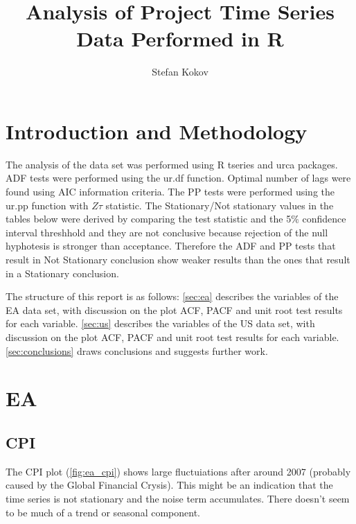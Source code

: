 \documentclass[10pt]{article}
\title{Analysis of Project Time Series Data Performed in R}
\author{Stefan Kokov}
\begin{document}
\maketitle



\section{Introduction and Methodology}
The analysis of the data set was performed using R tseries and urca packages.
ADF tests were performed using the ur.df function. Optimal number of lags were found using AIC information criteria. The PP tests were performed using the ur.pp function with $Z\tau$ statistic. The Stationary/Not stationary values in the tables below were derived by comparing the test statistic and the 5$\%$ confidence interval threshhold and they are not conclusive because rejection of the null hyphotesis is stronger than acceptance. Therefore the ADF and PP tests that result in Not Stationary conclusion show weaker results than the ones that result in a Stationary conclusion.

The structure of this report is as follows: \autoref{sec:ea} describes the variables of the EA data set, with discussion on the plot ACF, PACF and unit root test results for each variable. \autoref{sec:us} describes the variables of the US data set, with discussion on the plot ACF, PACF and unit root test results for each variable. \autoref{sec:conclusions} draws conclusions and suggests further work.



\pagebreak



\section{EA}
\label{sec:ea}


\subsection{CPI}
The CPI plot (\autoref{fig:ea_cpi}) shows large fluctuiations after around 2007 (probably caused by the Global Financial Crysis). This might be an indication that the time series is not stationary and the noise term accumulates. There doesn't seem to be much of a trend or seasonal component.
\end{document}
